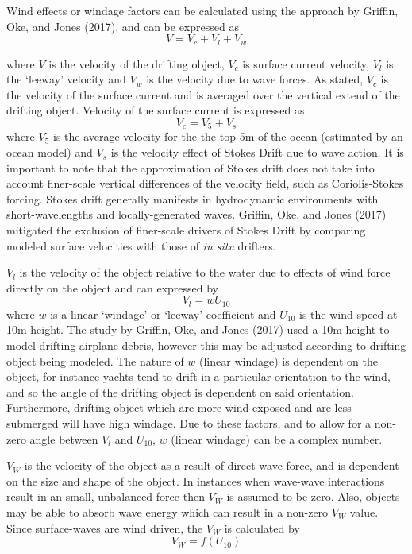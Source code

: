 \documentclass[
]{article}
\begin{document}
Wind effects or windage factors can be calculated using the approach by
Griffin, Oke, and Jones (2017), and can be expressed as
\[V = V_c + V_l + V_w\]

where \(V\) is the velocity of the drifting object, \(V_c\) is surface
current velocity, \(V_l\) is the `leeway' velocity and \(V_w\) is the
velocity due to wave forces. As stated, \(V_c\) is the velocity of the
surface current and is averaged over the vertical extend of the drifting
object. Velocity of the surface current is expressed as
\[V_c = V_5 + V_s\] where \(V_5\) is the average velocity for the the
top 5m of the ocean (estimated by an ocean model) and \(V_s\) is the
velocity effect of Stokes Drift due to wave action. It is important to
note that the approximation of Stokes drift does not take into account
finer-scale vertical differences of the velocity field, such as
Coriolis-Stokes forcing. Stokes drift generally manifests in
hydrodynamic environments with short-wavelengths and locally-generated
waves. Griffin, Oke, and Jones (2017) mitigated the exclusion of
finer-scale drivers of Stokes Drift by comparing modeled surface
velocities with those of \emph{in situ} drifters.

\(V_l\) is the velocity of the object relative to the water due to
effects of wind force directly on the object and can expressed by
\[V_l = w U_10\] where \(w\) is a linear `windage' or `leeway'
coefficient and \(U_10\) is the wind speed at 10m height. The study by
Griffin, Oke, and Jones (2017) used a 10m height to model drifting
airplane debris, however this may be adjusted according to drifting
object being modeled. The nature of \(w\) (linear windage) is dependent
on the object, for instance yachts tend to drift in a particular
orientation to the wind, and so the angle of the drifting object is
dependent on said orientation. Furthermore, drifting object which are
more wind exposed and are less submerged will have high windage. Due to
these factors, and to allow for a non-zero angle between \(V_l\) and
\(U_10\), \(w\) (linear windage) can be a complex number.

\(V_W\) is the velocity of the object as a result of direct wave force,
and is dependent on the size and shape of the object. In instances when
wave-wave interactions result in an small, unbalanced force then \(V_W\)
is assumed to be zero. Also, objects may be able to absorb wave energy
which can result in a non-zero \(V_W\) value. Since surface-waves are
wind driven, the \(V_W\) is calculated by \[V_W = f(U_10)\]
\end{document}
